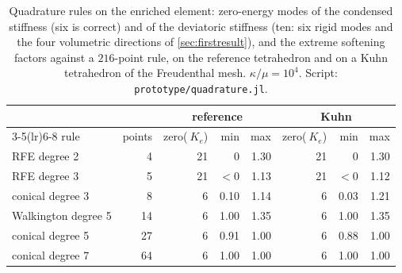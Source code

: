 \documentclass{article}
\newcommand{\code}[1]{\texttt{#1}}
\theoremstyle{definition}
\theoremstyle{plain}
\begin{document}
\begin{table}[tbp]
\centering
\caption{Quadrature rules on the enriched element: zero-energy modes of the
condensed stiffness (six is correct) and of the deviatoric stiffness (ten:
six rigid modes and the four volumetric directions of
\cref{sec:firstresult}), and the extreme softening
factors against a $216$-point rule, on the reference tetrahedron and on a
Kuhn tetrahedron of the Freudenthal mesh. $\kappa/\mu = 10^4$. Script:
\code{prototype/quadrature.jl}.}
\label{tab:quadrature}
\begin{tabular}{@{}lrrrrrrr@{}}
\toprule
& & \multicolumn{3}{c}{reference} & \multicolumn{3}{c}{Kuhn} \\
\cmidrule(lr){3-5}\cmidrule(lr){6-8}
rule & points & zero($~K_e$) & min & max & zero($~K_e$) & min & max \\
\midrule
RFE degree 2            & 4   & 21 & 0     & 1.30 & 21 & 0     & 1.30 \\
RFE degree 3            & 5   & 21 & $<0$  & 1.13 & 21 & $<0$  & 1.12 \\
conical degree 3        & 8   & 6  & 0.10  & 1.14 & 6  & 0.03  & 1.21 \\
Walkington degree 5     & 14  & 6  & 1.00  & 1.35 & 6  & 1.00  & 1.35 \\
conical degree 5        & 27  & 6  & 0.91  & 1.00 & 6  & 0.88  & 1.00 \\
conical degree 7        & 64  & 6  & 1.00  & 1.00 & 6  & 1.00  & 1.00 \\
\bottomrule
\end{tabular}
\end{table}
\end{document}
